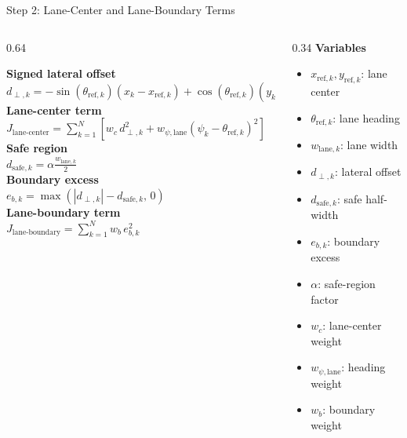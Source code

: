 \documentclass[aspectratio=169]{beamer}
\begin{document}
\begin{frame}{Step 2: Lane-Center and Lane-Boundary Terms}
\small
\begin{columns}[T,onlytextwidth]
\begin{column}{0.64\textwidth}
\begin{flushleft}
\textbf{Signed lateral offset}\\[0.3em]
$\displaystyle
d_{\perp,k}
=
-\sin(\theta_{\mathrm{ref},k})(x_k-x_{\mathrm{ref},k})
+
\cos(\theta_{\mathrm{ref},k})(y_k-y_{\mathrm{ref},k})
$\\[0.8em]

\textbf{Lane-center term}\\[0.3em]
$\displaystyle
J_{\mathrm{lane\mbox{-}center}}
=
\sum_{k=1}^{N}
\left[
w_c\,d_{\perp,k}^2
+
w_{\psi,\mathrm{lane}}(\psi_k-\theta_{\mathrm{ref},k})^2
\right]
$\\[0.8em]

\textbf{Safe region}\\[0.3em]
$\displaystyle
d_{\mathrm{safe},k}
=
\alpha \frac{w_{\mathrm{lane},k}}{2}
$\\[0.8em]

\textbf{Boundary excess}\\[0.3em]
$\displaystyle
e_{b,k}
=
\max\!\left(|d_{\perp,k}|-d_{\mathrm{safe},k},\,0\right)
$\\[0.8em]

\textbf{Lane-boundary term}\\[0.3em]
$\displaystyle
J_{\mathrm{lane\mbox{-}boundary}}
=
\sum_{k=1}^{N}
w_b\,e_{b,k}^{2}
$\\
\end{flushleft}
\end{column}

\begin{column}{0.34\textwidth}
\textbf{Variables}
\begin{itemize}
\item $x_{\mathrm{ref},k},y_{\mathrm{ref},k}$: lane center
\item $\theta_{\mathrm{ref},k}$: lane heading
\item $w_{\mathrm{lane},k}$: lane width
\item $d_{\perp,k}$: lateral offset
\item $d_{\mathrm{safe},k}$: safe half-width
\item $e_{b,k}$: boundary excess
\item $\alpha$: safe-region factor
\item $w_c$: lane-center weight
\item $w_{\psi,\mathrm{lane}}$: heading weight
\item $w_b$: boundary weight
\end{itemize}
\end{column}
\end{columns}
\end{frame}
\end{document}
